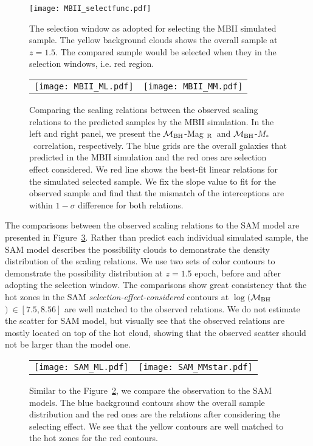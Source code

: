 \documentclass{natureprintstyle}
\newcommand{\mbh}{$\mathcal M_{\rm BH}$}
\newcommand{\mr}{Mag$_{\rm ~R}$}
\newcommand{\mstar}{{$M_*$}}
\begin{document}
\begin{figure}[t]
\texttt{[image: MBII\_selectfunc.pdf]}
\caption{The selection window as adopted for selecting the MBII simulated sample. The yellow background clouds shows the overall sample at $z=1.5$. The compared sample would be selected when they in the selection windows, i.e. red region.
}
\label{fig:selectfunc}
\end{figure}

\begin{figure*}[t]%
\begin{tabular}{c c}
\texttt{[image: MBII\_ML.pdf]} &
\texttt{[image: MBII\_MM.pdf]} \\
\end{tabular}
\caption{
Comparing the scaling relations between the observed scaling relations to the predicted samples by the MBII simulation. In the left and right panel, we present the \mbh-\mr\ and \mbh-\mstar\ correlation, respectively. The blue grids are the overall galaxies that predicted in the MBII simulation and the red ones are selection effect considered. We red line shows the best-fit linear relations for the simulated selected sample. We fix the slope value to fit for the observed sample and find that the mismatch of the interceptions are within $1-\sigma$ difference for both relations. %
}
\label{fig:MBII_comp}
\end{figure*}

The comparisons between the observed scaling relations to the SAM model are presented in Figure~\ref{fig:SAM_comp}. Rather than predict each individual simulated sample, the SAM model describes the possibility clouds to demonstrate the density distribution of the scaling relations. We use two sets of color contours to demonstrate the possibility distribution at $z=1.5$ epoch, before and after adopting the selection window. The comparisons show great consistency that the hot zones in the SAM {\it selection-effect-considered} contours at $\log($\mbh$)~\in[7.5, 8.56]$ are well matched to the observed relations. We do not estimate the scatter for SAM model, but visually see that the observed relations are mostly located on top of the hot cloud, showing that the observed scatter should not be larger than the model one.

\begin{figure*}[t]%
\begin{tabular}{c c}
\texttt{[image: SAM\_ML.pdf]} &
\texttt{[image: SAM\_MMstar.pdf]} \\
\end{tabular}
\caption{ Similar to the Figure~\ref{fig:MBII_comp}, we compare the observation to the SAM models. The blue background contours show the overall sample distribution and the red ones are the relations after considering the selecting effect. We see that the yellow contours are well matched to the hot zones for the red contours.
}
\label{fig:SAM_comp}
\end{figure*}
\end{document}
